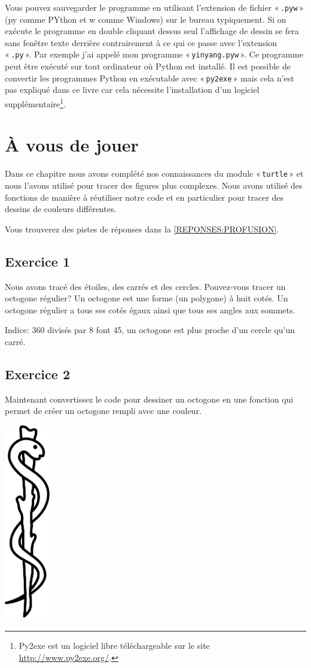 Vous pouvez sauvegarder le programme en utilisant l'extension de fichier « \texttt{.pyw} » (py comme PYthon et w comme Windows) sur le bureau typiquement. Si on exécute le programme en double cliquant dessus seul l'affichage de dessin se fera sans fenêtre texte derrière contrairement à ce qui ce passe avec l'extension « \texttt{.py} ». Par exemple j'ai appelé mon programme « \texttt{yinyang.pyw} ». Ce programme peut être exécuté sur tout ordinateur où Python est installé. Il est possible de convertir les programmes Python en exécutable avec « \texttt{py2exe} » mais cela n'est pas expliqué dans ce livre car cela nécessite l'installation d'un logiciel supplémentaire\footnote{Py2exe est un logiciel libre téléchargeable sur le site \url{http://www.py2exe.org/}.}.


\section{À vous de jouer\label{PRATIQUE:PROFUSION}}

Dans ce chapitre nous avons complété nos connaissances du module « \texttt{turtle} » et nous l'avons utilisé pour tracer des figures plus complexes. Nous avons utilisé des fonctions de manière à réutiliser notre code et en particulier pour tracer des dessins de couleurs différentes.

Vous trouverez des pistes de réponses dans la \autoref{REPONSES:PROFUSION}.


\subsection{Exercice 1}
Nous avons tracé des étoiles, des carrés et des cercles. Pouvez-vous tracer un octogone régulier? Un octogone est une forme (un polygone) à huit cotés. Un octogone régulier a tous ses cotés égaux ainsi que tous ses angles aux sommets.

Indice: 360 divisés par 8 font 45, un octogone est plus proche d'un cercle qu'un carré.

\subsection{Exercice 2}
Maintenant convertissez le code pour dessiner un octogone en une fonction qui permet de créer un octogone rempli avec une couleur.


 \vfill
\begin{center}
 \includegraphics[width=2cm]{images/Esclapius_stick.pdf}
\end{center}
 \vfill

